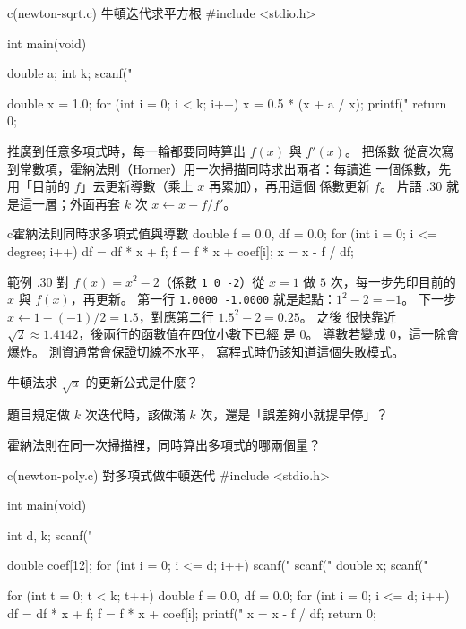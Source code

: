 \begin{example}{c}{(newton-sqrt.c) 牛頓迭代求平方根}
#include <stdio.h>

int main(void) {
    double a;
    int k;
    scanf("%

    double x = 1.0;
    for (int i = 0; i < k; i++) {
        x = 0.5 * (x + a / x);
    }
    printf("%
    return 0;
}
\end{example}


推廣到任意多項式時，每一輪都要同時算出 $f(x)$ 與 $f'(x)$。 把係數
從高次寫到常數項，霍納法則（Horner）用一次掃描同時求出兩者：每讀進
一個係數，先用「目前的 $f$」去更新導數（乘上 $x$ 再累加），再用這個
係數更新 $f$。 片語 \thechapter.30 就是這一層；外面再套 $k$ 次
$x \leftarrow x - f/f'$。

\begin{code}{c}{霍納法則同時求多項式值與導數}
double f = 0.0, df = 0.0;
for (int i = 0; i <= degree; i++) {
    df = df * x + f;
    f = f * x + coef[i];
}
x = x - f / df;
\end{code}

範例 \thechapter.30 對 $f(x) = x^2 - 2$（係數 \texttt{1 0 -2}）從
$x=1$ 做 $5$ 次，每一步先印目前的 $x$ 與 $f(x)$，再更新。 第一行
\texttt{1.0000 -1.0000} 就是起點：$1^2-2=-1$。 下一步
$x \leftarrow 1 - (-1)/2 = 1.5$，對應第二行 $1.5^2-2=0.25$。 之後
很快靠近 $\sqrt{2}\approx 1.4142$，後兩行的函數值在四位小數下已經
是 $0$。 導數若變成 $0$，這一除會爆炸。 測資通常會保證切線不水平，
寫程式時仍該知道這個失敗模式。

\begin{drills}[label=drills:float-newton]
\item 牛頓法求 $\sqrt{a}$ 的更新公式是什麼？
\item 題目規定做 $k$ 次迭代時，該做滿 $k$ 次，還是「誤差夠小就提早停」？
\item 霍納法則在同一次掃描裡，同時算出多項式的哪兩個量？
\end{drills}

\begin{example}{c}{(newton-poly.c) 對多項式做牛頓迭代}
#include <stdio.h>

int main(void) {
    int d, k;
    scanf("%

    double coef[12];
    for (int i = 0; i <= d; i++) {
        scanf("%
    }
    scanf("%
    double x;
    scanf("%

    for (int t = 0; t < k; t++) {
        double f = 0.0, df = 0.0;
        for (int i = 0; i <= d; i++) {
            df = df * x + f;
            f = f * x + coef[i];
        }
        printf("%
        x = x - f / df;
    }
    return 0;
}
\end{example}

